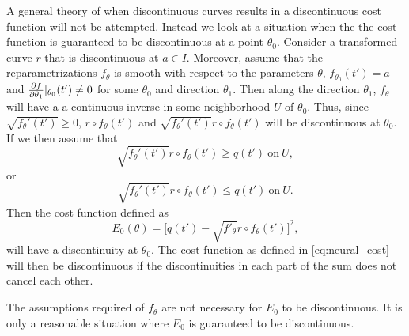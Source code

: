 A general theory of when discontinuous curves results in a discontinuous cost function will not be attempted. Instead we look at a situation when the the cost function is guaranteed to be discontinuous at a point \(\theta_0\). Consider a transformed curve  \(r\) that is discontinuous at  \(a \in I\). Moreover, assume that the reparametrizations  \(f_{\theta}\) is smooth with respect to the parameters  \(\theta\), \(f_{\theta_0}(t')=a\) and  \(\pdv{f}{\theta_1}|_{\theta_0}(t')\neq 0\) for some  \(\theta_0\) and direction \(\theta_1\). Then along the direction  \(\theta_1\),  \(f_{\theta}\) will have a a continuous inverse in some neighborhood  \(U\) of  \(\theta_0\). Thus, since \(\sqrt{f_{\theta}'(t')} \geq 0\), \(r \circ f_\theta(t')\) and  \(\sqrt{f_{\theta}'(t')} r \circ f_\theta(t')\) will be discontinuous at \(\theta_0\). If we then assume that
\begin{equation*}
  \sqrt{f_{\theta}'(t')} r \circ f_\theta(t') \geq  q(t')\ \text{on} \ U,
\end{equation*}
or
\begin{equation*}
  \sqrt{f_{\theta}'(t')} r \circ f_\theta(t') \leq q(t') \ \text{on} \ U.
\end{equation*}
Then the cost function defined as
\begin{equation*}
  E_0(\theta) = \big[q(t') - \sqrt{f'_{\theta}} r \circ f_{\theta}(t')\big]^2,
\end{equation*}
will have a discontinuity at  \(\theta_0\). The cost function as defined in \eqref{eq:neural_cost} will then be discontinuous if the discontinuities in each part of the sum does not cancel each other.

The assumptions required of  \(f_{\theta}\) are not necessary for \(E_0\) to be discontinuous. It is only a reasonable situation where \(E_0\) is guaranteed to be discontinuous.

